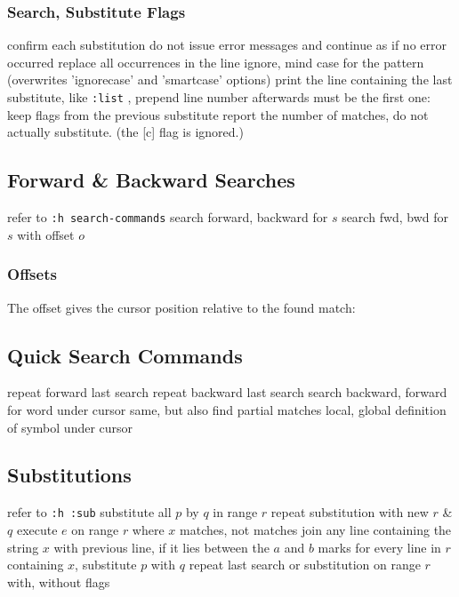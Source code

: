 \subsubsection{Search, Substitute Flags }{}
	{confirm each substitution}
	{do not issue error messages and continue as if no error occurred}
	{replace all occurrences in the line}
	{ignore, mind case for the pattern (overwrites 'ignorecase' and 'smartcase' options)}
	{print the line containing the last substitute, like {\tt :list} , prepend line number afterwards}
\cmdOper{\&}	{must be the first one: keep flags from the previous substitute}
	{report the number of matches, do not actually substitute.  (the [c] flag is ignored.) }

\subsection{Forward \& Backward Searches}	{refer to {\tt :h search-commands}}
	{search forward, backward for $s$}
	{search fwd, bwd for $s$ with offset $o$}

\subsubsection{Offsets}	{}
The offset gives the cursor position relative to the found match:\\

\subsection{Quick Search Commands}	{}
	{repeat forward last search}
	{repeat backward last search}
\cmdS{\# * }	{search backward, forward for word under cursor}
	{same, but also find partial matches}
	{local, global definition of symbol under cursor}

\subsection{Substitutions}	{refer to {\tt :h :sub}}
	{substitute all $p$ by $q$ in range $r$}
	{repeat substitution with new $r$ \& $q$}
	{execute $e$ on range $r$ where $x$ mat\-ches, not matches}
	{join any line containing the string $x$ with
previous line, if it lies between the $a$ and $b$ marks}
	{for every line in $r$ containing $x$, substitute $p$ with $q$}
	{repeat last search or substitution on range $r$ with, without flags}


